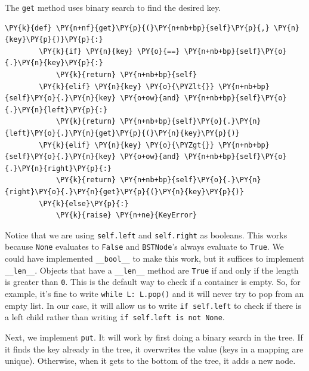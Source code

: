 The \texttt{get} method uses binary search to find the desired key.

\begin{Verbatim}[commandchars=\\\{\}]
    \PY{k}{def} \PY{n+nf}{get}\PY{p}{(}\PY{n+nb+bp}{self}\PY{p}{,} \PY{n}{key}\PY{p}{)}\PY{p}{:}
        \PY{k}{if} \PY{n}{key} \PY{o}{==} \PY{n+nb+bp}{self}\PY{o}{.}\PY{n}{key}\PY{p}{:}
            \PY{k}{return} \PY{n+nb+bp}{self}
        \PY{k}{elif} \PY{n}{key} \PY{o}{\PYZlt{}} \PY{n+nb+bp}{self}\PY{o}{.}\PY{n}{key} \PY{o+ow}{and} \PY{n+nb+bp}{self}\PY{o}{.}\PY{n}{left}\PY{p}{:}
            \PY{k}{return} \PY{n+nb+bp}{self}\PY{o}{.}\PY{n}{left}\PY{o}{.}\PY{n}{get}\PY{p}{(}\PY{n}{key}\PY{p}{)}
        \PY{k}{elif} \PY{n}{key} \PY{o}{\PYZgt{}} \PY{n+nb+bp}{self}\PY{o}{.}\PY{n}{key} \PY{o+ow}{and} \PY{n+nb+bp}{self}\PY{o}{.}\PY{n}{right}\PY{p}{:}
            \PY{k}{return} \PY{n+nb+bp}{self}\PY{o}{.}\PY{n}{right}\PY{o}{.}\PY{n}{get}\PY{p}{(}\PY{n}{key}\PY{p}{)}
        \PY{k}{else}\PY{p}{:}
            \PY{k}{raise} \PY{n+ne}{KeyError}
\end{Verbatim}



Notice that we are using \texttt{self.left} and \texttt{self.right} as booleans.
This works because \texttt{None} evaluates to \texttt{False} and \texttt{BSTNode}'s always evaluate to \texttt{True}.
We could have implemented \texttt{\_\_bool\_\_} to make this work, but it suffices to implement \texttt{\_\_len\_\_}.  Objects that have a \texttt{\_\_len\_\_} method are \texttt{True} if and only if the length is greater than \texttt{0}.  This is the default way to check if a container is empty.  So, for example, it's fine to write \texttt{while L: L.pop()} and it will never try to pop from an empty list.  In our case, it will allow us to write \texttt{if self.left} to check if there is a left child rather than writing \texttt{if self.left is not None}.


Next, we implement \texttt{put}.  It will work by first doing a binary search in the tree.  If it finds the key already in the tree, it overwrites the value (keys in a mapping are unique).  Otherwise, when it gets to the bottom of the tree, it adds a new node.  

